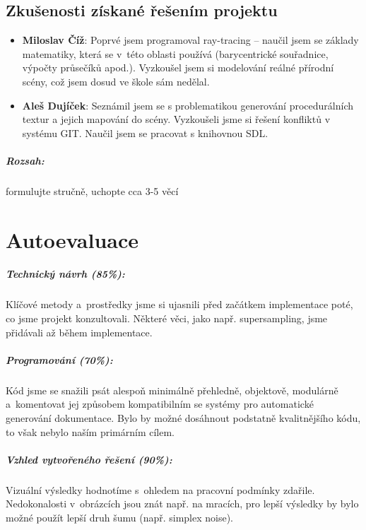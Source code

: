 \documentclass[12pt,a4paper,titlepage,final]{report}
\newcommand\AuthorA{Miloslav Číž}
\newcommand\AuthorB{Aleš Dujíček}
\begin{document}
\section{Zkušenosti získané řešením projektu}

\begin{itemize}
\item \textbf{\AuthorA}: Poprvé jsem programoval ray-tracing -- naučil
jsem se základy matematiky, která se v~této oblasti
používá (barycentrické souřadnice, výpočty průsečíků apod.). Vyzkoušel
jsem si modelování reálné přírodní scény, což jsem dosud ve škole sám
nedělal.
\item \textbf{\AuthorB}: Seznámil jsem se s problematikou generování
procedurálních textur a jejich mapování do scény. Vyzkoušeli jsme si
řešení konfliktů v systému GIT. Naučil jsem se pracovat s knihovnou SDL.
\end{itemize}

\paragraph{Rozsah:} formulujte stručně, uchopte cca 3-5 věcí

\chapter{Autoevaluace}

\paragraph{Technický návrh (85\%):}
Klíčové metody a~prostředky jsme si ujasnili před začátkem implementace
poté, co jsme projekt konzultovali. Některé věci, jako např.
supersampling, jsme přidávali až během implementace.

\paragraph{Programování (70\%):}
Kód jsme se snažili psát alespoň minimálně přehledně, objektově,
modulárně a~komentovat jej způsobem kompatibilním se systémy
pro automatické generování dokumentace. Bylo by možné
dosáhnout podstatně kvalitnějšího kódu, to však nebylo naším primárním
cílem.

\paragraph{Vzhled vytvořeného řešení (90\%):}
Vizuální výsledky hodnotíme s~ohledem na pracovní podmínky zdařile.
Nedokonalosti v~obrázcích jsou znát např. na mracích, pro lepší výsledky
by bylo možné použít lepší druh šumu (např. simplex noise).
\end{document}
